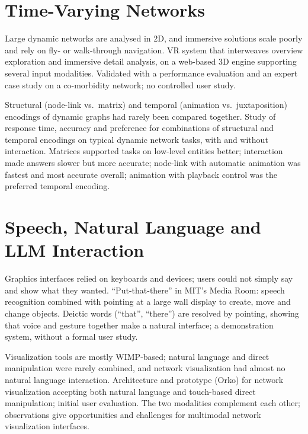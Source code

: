 \documentclass[11pt,a4paper]{article}
\begin{document}
\section{Time-Varying Networks}
\label{sec:time}

\prob Large dynamic networks are analysed in 2D, and immersive solutions scale poorly and
rely on fly- or walk-through navigation.
\meth VR system that interweaves overview exploration and immersive detail analysis, on a
web-based 3D engine supporting several input modalities.
\res Validated with a performance evaluation and an expert case study on a co-morbidity
network; no controlled user study.

\prob Structural (node-link vs.\ matrix) and temporal (animation vs.\ juxtaposition)
encodings of dynamic graphs had rarely been compared together.
\meth Study of response time, accuracy and preference for combinations of structural and
temporal encodings on typical dynamic network tasks, with and without interaction.
\res Matrices supported tasks on low-level entities better; interaction made answers
slower but more accurate; node-link with automatic animation was fastest and most accurate
overall; animation with playback control was the preferred temporal encoding.

\section{Speech, Natural Language and LLM Interaction}
\label{sec:voice}

\prob Graphics interfaces relied on keyboards and devices; users could not simply say and
show what they wanted.
\meth ``Put-that-there'' in MIT's Media Room: speech recognition combined with pointing at
a large wall display to create, move and change objects.
\res Deictic words (``that'', ``there'') are resolved by pointing, showing that voice and
gesture together make a natural interface; a demonstration system, without a formal user
study.

\prob Visualization tools are mostly WIMP-based; natural language and direct manipulation
were rarely combined, and network visualization had almost no natural language interaction.
\meth Architecture and prototype (Orko) for network visualization accepting both natural
language and touch-based direct manipulation; initial user evaluation.
\res The two modalities complement each other; observations give opportunities and
challenges for multimodal network visualization interfaces.
\end{document}

